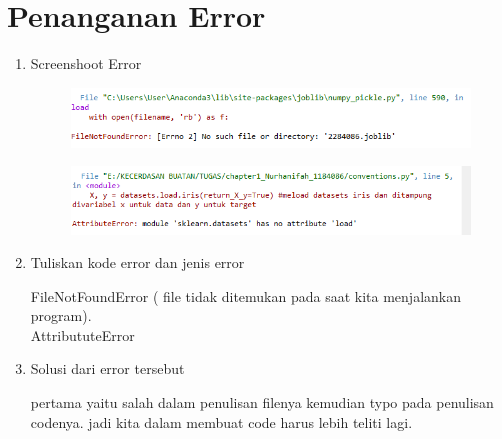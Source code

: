 \section{Penanganan Error}
\begin{enumerate}

\item Screenshoot Error
\begin{figure}[!htbp]
    \centering
    \includegraphics[scale=0.8]{figures/error1.PNG}
    \end{figure}
    \begin{figure}[!htbp]
    \centering
    \includegraphics[scale=0.8]{figures/error2.PNG}
    \end{figure}
\item Tuliskan kode error dan jenis error
\par 
FileNotFoundError ( file tidak ditemukan pada saat kita menjalankan program).\\
AttribututeError
\item Solusi dari error tersebut
\par 
pertama yaitu salah dalam penulisan filenya kemudian typo pada penulisan codenya. jadi kita dalam membuat code harus lebih teliti lagi.
\end{enumerate}


